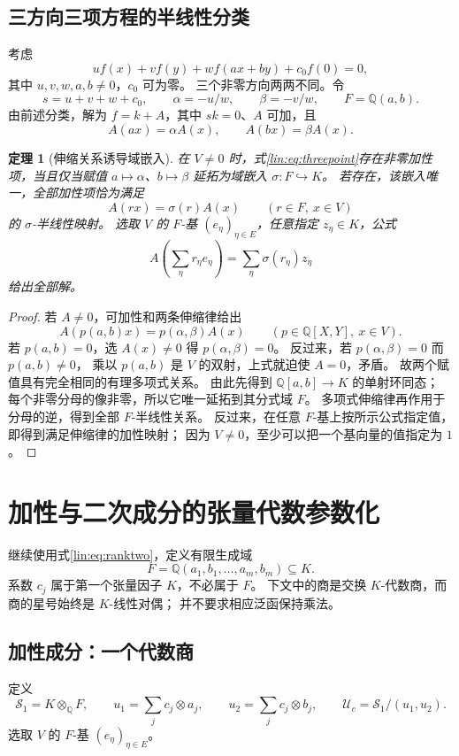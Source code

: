 \documentclass[11pt,a4paper,oneside,openany]{book}
\theoremstyle{lecture}
\newtheorem{theorem}{定理}[section]
\newcommand{\Q}{\mathbb Q}
\newcommand{\Uc}{\mathscr U_c}
\numberwithin{equation}{section}
\begin{document}
\subsection{三方向三项方程的半线性分类}
考虑
\begin{equation}\label{lin:eq:threepoint}
 u f(x)+v f(y)+w f(ax+by)+c_0f(0)=0,
\end{equation}
其中 $u,v,w,a,b\ne0$，$c_0$ 可为零。
三个非零方向两两不同。令
\[
 s=u+v+w+c_0,\qquad
 \alpha=-u/w,\qquad \beta=-v/w,\qquad F=\Q(a,b).
\]
由前述分类，解为 $f=k+A$，其中 $sk=0$、$A$ 可加，且
\[
 A(ax)=\alpha A(x),\qquad A(bx)=\beta A(x).
\]

\begin{theorem}[伸缩关系诱导域嵌入]\label{lin:thm:semilinear}
在 $V\ne0$ 时，式\eqref{lin:eq:threepoint}存在非零加性项，当且仅当赋值
$a\mapsto\alpha$、$b\mapsto\beta$ 延拓为域嵌入
$\sigma:F\hookrightarrow K$。
若存在，该嵌入唯一，全部加性项恰为满足
\[
 A(rx)=\sigma(r)A(x)\qquad(r\in F,\ x\in V)
\]
的 $\sigma$-半线性映射。
选取 $V$ 的 $F$-基 $(e_\eta)_{\eta\in E}$，任意指定 $z_\eta\in K$，公式
\[
 A\!\left(\sum_\eta r_\eta e_\eta\right)
 =\sum_\eta\sigma(r_\eta)z_\eta
\]
给出全部解。
\end{theorem}
\begin{proof}
若 $A\ne0$，可加性和两条伸缩律给出
\[
 A(p(a,b)x)=p(\alpha,\beta)A(x)
 \qquad(p\in\Q[X,Y],\ x\in V).
\]
若 $p(a,b)=0$，选 $A(x)\ne0$ 得 $p(\alpha,\beta)=0$。
反过来，若 $p(\alpha,\beta)=0$ 而 $p(a,b)\ne0$，
乘以 $p(a,b)$ 是 $V$ 的双射，上式就迫使 $A=0$，矛盾。
故两个赋值具有完全相同的有理多项式关系。
由此先得到 $\Q[a,b]\to K$ 的单射环同态；
每个非零分母的像非零，所以它唯一延拓到其分式域 $F$。
多项式伸缩律再作用于分母的逆，得到全部 $F$-半线性关系。
反过来，在任意 $F$-基上按所示公式指定值，即得到满足伸缩律的加性映射；
因为 $V\ne0$，至少可以把一个基向量的值指定为 $1$。
\end{proof}


\section{加性与二次成分的张量代数参数化}\label{lin:sec:tensor}
继续使用式\eqref{lin:eq:ranktwo}，定义有限生成域
\[
 F=\Q(a_1,b_1,\ldots,a_m,b_m)\subseteq K.
\]
系数 $c_j$ 属于第一个张量因子 $K$，不必属于 $F$。
下文中的商是交换 $K$-代数商，而商的星号始终是 $K$-线性对偶；
并不要求相应泛函保持乘法。

\subsection{加性成分：一个代数商}
定义
\[
 \mathscr S_1=K\otimes_{\Q}F,\qquad
 u_1=\sum_jc_j\otimes a_j,\qquad
 u_2=\sum_jc_j\otimes b_j,\qquad
 \Uc=\mathscr S_1/(u_1,u_2).
\]
选取 $V$ 的 $F$-基 $(e_\eta)_{\eta\in E}$。
\end{document}
